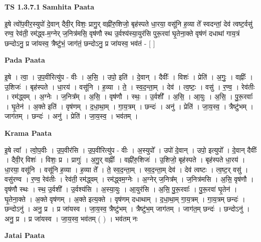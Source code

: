 \documentclass[17pt]{extarticle}
\begin{document}
\textbf{TS 1.3.7.1 } \newline
\textbf{Samhita Paata} \newline

इ॒षे त्वो॑प॒वीर॒स्युपो॑ दे॒वान् दैवी॒र् विशः॒ प्रागु॒र् वह्नी॑रु॒शिजो॒ बृह॑स्पते धा॒रया॒ वसू॑नि ह॒व्या ते᳚ स्वदन्तां॒ देव॑ त्वष्ट॒र्वसु॑ रण्व॒ रेव॑ती॒ रम॑द्ध्व-म॒ग्नेर् ज॒नित्र॑मसि॒ वृष॑णौ स्थ उ॒र्वश्य॑स्या॒युर॑सि पुरू॒रवा॑ घृ॒तेना॒क्ते वृष॑णं दधाथां गाय॒त्रं छन्दोऽनु॒ प्र जा॑यस्व॒ त्रैष्टु॑भं॒ जाग॑तं॒ छन्दोऽनु॒ प्र जा॑यस्व॒ भव॑तं - [ ] \newline

\textbf{Pada Paata} \newline

इ॒षे । त्वा॒ । उ॒प॒वीरित्यु॑प - वीः । अ॒सि॒ । उपो॒ इति॑ । दे॒वान् । दैवीः᳚ । विशः॑ । प्रेति॑ । अ॒गुः॒ । वह्नीः᳚ । उ॒शिजः॑ । बृह॑स्पते । धा॒रय॑ । वसू॑नि । ह॒व्या । ते॒ । स्व॒द॒न्ता॒म् । देव॑ । त्व॒ष्टः॒ । वसु॑ । र॒ण्व॒ । रेव॑तीः । रम॑द्ध्वम् । अ॒ग्नेः । ज॒नित्र᳚म् । अ॒सि॒ । वृष॑णौ । स्थः॒ । उ॒र्वशी᳚ । अ॒सि॒ । आ॒युः । अ॒सि॒ । पु॒रू॒रवाः᳚ । घृ॒तेन॑ । अ॒क्ते इति॑ । वृष॑णम् । द॒धा॒था॒म् । गा॒य॒त्रम् । छन्दः॑ । अनु॑ । प्रेति॑ । जा॒य॒स्व॒ । त्रैष्टु॑भम् । जाग॑तम् । छन्दः॑ । अनु॑ । प्रेति॑ । जा॒य॒स्व॒ । भव॑तम् ।  \newline


\textbf{Krama Paata} \newline

इ॒षे त्वा᳚ । त्वो॒प॒वीः । उ॒प॒वीर॑सि । उ॒प॒वीरित्यु॑प - वीः । अ॒स्युपो᳚ । उपो॑ दे॒वान् । उपो॒ इत्युपो᳚ । दे॒वान् दैवीः᳚ । दैवी॒र् विशः॑ । विशः॒ प्र । प्रागुः॑ । अ॒गु॒र् वह्नीः᳚ । वह्नी॑रु॒शिजः॑ । उ॒शिजो॒ बृह॑स्पते । बृह॑स्पते धा॒रय॑ । धा॒रया॒ वसू॑नि । वसू॑नि ह॒व्या । ह॒व्या ते᳚ । ते॒ स्व॒द॒न्ता॒म् । स्व॒द॒न्ता॒म् देव॑ । देव॑ त्वष्टः । त्व॒ष्ट॒र् वसु॑ । वसु॑रण्व । र॒ण्व॒ रेव॑तीः । रेव॑ती॒ रम॑द्ध्वम् । रम॑द्ध्वम॒ग्नेः । अ॒ग्नेर् ज॒नित्र᳚म् । ज॒नित्र॑मसि । अ॒सि॒ वृष॑णौ । वृष॑णौ स्थः । स्थ॒ उ॒र्वशी᳚ । उ॒र्वश्य॑सि । अ॒स्या॒युः । आ॒युर॑सि । अ॒सि॒ पु॒रू॒रवाः᳚ । पु॒रू॒रवा॑ घृ॒तेन॑ । घृ॒तेना॒क्ते । अ॒क्ते वृष॑णम् । अ॒क्ते इत्य॒क्ते । वृष॑णम् दधाथाम् । द॒धा॒था॒म् गा॒य॒त्रम् । गा॒य॒त्रम् छन्दः॑ । छन्दोऽनु॑ । अनु॒ प्र । प्र जा॑यस्व । जा॒य॒स्व॒ त्रैष्टु॑भम् । त्रैष्टु॑भ॒म् जाग॑तम् । जाग॑त॒म् छन्दः॑ । छन्दोऽनु॑ । अनु॒ प्र । प्र जा॑यस्व । जा॒य॒स्व॒ भव॑तम् ( ) । भव॑तम् नः \newline

\textbf{Jatai Paata} \newline
\end{document}
